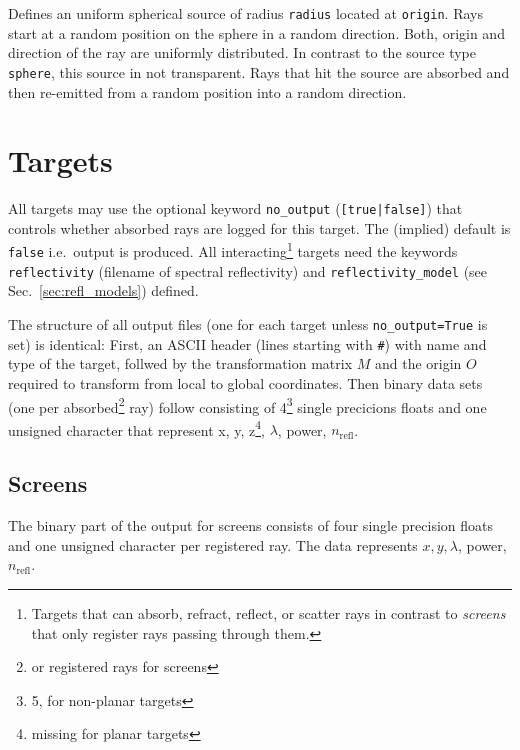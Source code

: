 \documentclass[10pt,a4paper,titlepage]{article}
\begin{document}






\vspace{0.25cm}
Defines an uniform spherical source of radius {\tt radius} located at {\tt origin}. Rays start at a random position on the sphere in a random direction. Both, origin and direction of the ray are uniformly distributed. In contrast to the source type {\tt sphere}, this source in not transparent. Rays that hit the source are absorbed and then re-emitted from a random position into a random direction.




\section{Targets}
All targets may use the optional keyword {\tt no\_output} ({\tt [true|false]}) that controls whether absorbed rays are logged for this target. The (implied) default is {\tt false} i.e.\ output is produced. All interacting\footnote{Targets that can absorb, refract, reflect, or scatter rays in contrast to {\it screens} that only register rays passing through them.} targets need the keywords {\tt reflectivity} (filename of spectral reflectivity) and {\tt reflectivity\_model} (see Sec.~\ref{sec:refl_models}) defined.

The structure of all output files (one for each target unless {\tt no\_output=True} is set) is identical: First, an ASCII header (lines starting with {\tt \#}) with name and type of the target, follwed by the transformation matrix $M$ and the origin $O$ required to transform from local to global coordinates. Then binary data sets (one per absorbed\footnote{or registered rays for screens} ray) follow consisting of 4\footnote{5, for non-planar targets} single precicions floats and one unsigned character that represent x, y, z\footnote{missing for planar targets}, $\lambda$, power, $n_{\mathrm{refl}}$.


\subsection{Screens}

The binary part of the output for screens consists of four single precision floats and one unsigned character per registered ray. The data represents $x, y, \lambda$, power, $n_{\mathrm{refl}}$.
\end{document}
